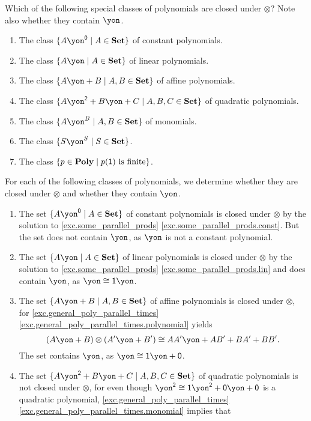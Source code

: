 \documentclass[Book-Poly]{subfiles}
\begin{document}
\begin{exercise}\label{exc.dir_closed_classes}
Which of the following special classes of polynomials are closed under $\otimes$? Note also whether they contain $\yon$.
\begin{enumerate}
	\item The class $\{A\yon^\0\mid A\in\smset\}$ of constant polynomials.
	\item The class $\{A\yon\mid A\in\smset\}$ of linear polynomials.
	\item The class $\{A\yon+B\mid A,B\in\smset\}$ of affine polynomials.
	\item The class $\{A\yon^\2+B\yon+C\mid A,B,C\in\smset\}$ of quadratic polynomials.
	\item The class $\{A\yon^B\mid A,B\in\smset\}$ of monomials.
	\item The class $\{S\yon^S\mid S\in\smset\}$.
	\item The class $\{p\in\mathbf{Poly}\mid p(\textsf{1})\text{ is finite}\}$. \qedhere
\end{enumerate}
\begin{solution}
For each of the following classes of polynomials, we determine whether they are closed under $\otimes$ and whether they contain $\yon$.
\begin{enumerate}
	\item The set $\{A\yon^\0\mid A\in\smset\}$ of constant polynomials is closed under $\otimes$ by the solution to \cref{exc.some_parallel_prods} \cref{exc.some_parallel_prods.const}.
	But the set does not contain $\yon$, as $\yon$ is not a constant polynomial.
	\item The set $\{A\yon\mid A\in\smset\}$ of linear polynomials is closed under $\otimes$ by the solution to \cref{exc.some_parallel_prods} \cref{exc.some_parallel_prods.lin} and does contain $\yon$, as $\yon \iso \1\yon$.
	\item The set $\{A\yon+B\mid A,B\in\smset\}$ of affine polynomials is closed under $\otimes$, for \cref{exc.general_poly_parallel_times} \cref{exc.general_poly_parallel_times.polynomial} yields
	\[
	    (A\yon + B) \otimes (A'\yon + B') \iso AA'\yon + AB' + BA' + BB'.
	\]
	The set contains $\yon$, as $\yon \iso \1\yon + \0 $.
	\item The set $\{A\yon^\2+B\yon+C\mid A,B,C\in\smset\}$ of quadratic polynomials is not closed under $\otimes$, for even though $\yon^\2 \iso \1\yon^\2 + \0\yon + \0$ is a quadratic polynomial, \cref{exc.general_poly_parallel_times} \cref{exc.general_poly_parallel_times.monomial} implies that

\end{enumerate}
\end{solution}
\end{exercise}
\end{document}
